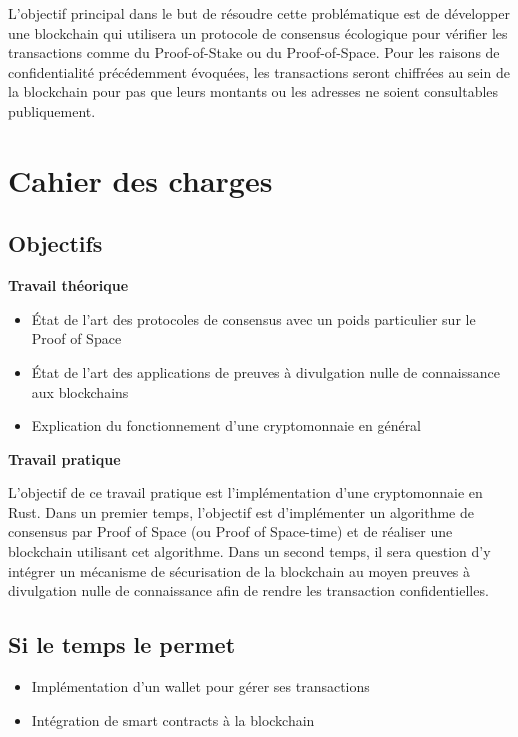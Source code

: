 \documentclass[../tb_report.tex]{subfiles}
\begin{document}
L'objectif principal dans le but de résoudre cette problématique est de développer une blockchain qui utilisera un protocole de consensus écologique pour vérifier les transactions comme du Proof-of-Stake ou du Proof-of-Space. Pour les raisons de confidentialité précédemment évoquées, les transactions seront chiffrées au sein de la blockchain pour pas que leurs montants ou les adresses ne soient consultables publiquement.

\section*{Cahier des charges}

\subsection*{Objectifs}

\textbf{Travail théorique}
\begin{itemize}
    \item État de l'art des protocoles de consensus avec un poids particulier sur le Proof of Space
    \item État de l'art des applications de preuves à divulgation nulle de connaissance aux blockchains
    \item Explication du fonctionnement d'une cryptomonnaie en général
\end{itemize}

\textbf{Travail pratique}

L'objectif de ce travail pratique est l'implémentation d'une cryptomonnaie en Rust.
Dans un premier temps, l'objectif est d'implémenter un algorithme de consensus par Proof of Space (ou Proof of Space-time) et de réaliser une blockchain utilisant cet algorithme.
Dans un second temps, il sera question d'y intégrer un mécanisme de sécurisation de la blockchain au moyen preuves à divulgation nulle de connaissance afin de rendre les transaction confidentielles.

\subsection*{Si le temps le permet}

\begin{itemize}
    \item Implémentation d'un wallet pour gérer ses transactions
    \item Intégration de smart contracts à la blockchain
\end{itemize}
\end{document}
